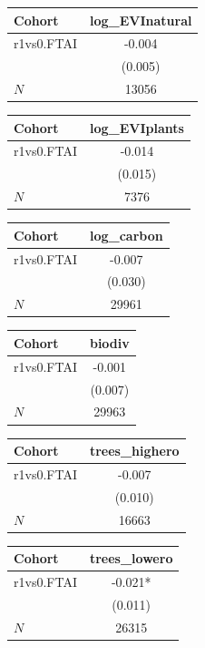 {
\def\sym#1{\ifmmode^{#1}\else\(^{#1}\)\fi}
\begin{tabular}{l*{1}{c}}
\toprule
Cohort    &log\_EVInatural   \\
\midrule
r1vs0.FTAI&   -0.004   \\
          &  (0.005)   \\
\midrule
\(N\)     &    13056   \\
\bottomrule
\end{tabular}
}
{
\def\sym#1{\ifmmode^{#1}\else\(^{#1}\)\fi}
\begin{tabular}{l*{1}{c}}
\toprule
Cohort    &log\_EVIplants   \\
\midrule
r1vs0.FTAI&   -0.014   \\
          &  (0.015)   \\
\midrule
\(N\)     &     7376   \\
\bottomrule
\end{tabular}
}
{
\def\sym#1{\ifmmode^{#1}\else\(^{#1}\)\fi}
\begin{tabular}{l*{1}{c}}
\toprule
Cohort    &log\_carbon   \\
\midrule
r1vs0.FTAI&   -0.007   \\
          &  (0.030)   \\
\midrule
\(N\)     &    29961   \\
\bottomrule
\end{tabular}
}
{
\def\sym#1{\ifmmode^{#1}\else\(^{#1}\)\fi}
\begin{tabular}{l*{1}{c}}
\toprule
Cohort    &   biodiv   \\
\midrule
r1vs0.FTAI&   -0.001   \\
          &  (0.007)   \\
\midrule
\(N\)     &    29963   \\
\bottomrule
\end{tabular}
}
{
\def\sym#1{\ifmmode^{#1}\else\(^{#1}\)\fi}
\begin{tabular}{l*{1}{c}}
\toprule
Cohort    &trees\_highero   \\
\midrule
r1vs0.FTAI&   -0.007   \\
          &  (0.010)   \\
\midrule
\(N\)     &    16663   \\
\bottomrule
\end{tabular}
}
{
\def\sym#1{\ifmmode^{#1}\else\(^{#1}\)\fi}
\begin{tabular}{l*{1}{c}}
\toprule
Cohort    &trees\_lowero   \\
\midrule
r1vs0.FTAI&   -0.021*  \\
          &  (0.011)   \\
\midrule
\(N\)     &    26315   \\
\bottomrule
\end{tabular}
}

